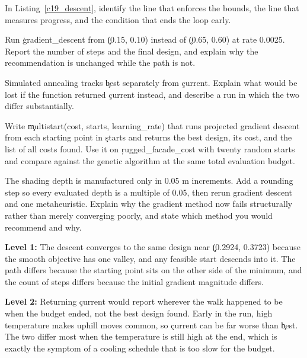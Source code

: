 

In Listing~\ref{c19_descent}, identify the line that enforces the bounds, the
line that measures progress, and the condition that ends the loop early.


Run \c{gradient_descent} from \c{(0.15, 0.10)} instead of \c{(0.65, 0.60)} at
rate 0.0025. Report the number of steps and the final design, and explain why the
recommendation is unchanged while the path is not.


Simulated annealing tracks \c{best} separately from \c{current}. Explain what
would be lost if the function returned \c{current} instead, and describe a run in
which the two differ substantially.


Write \c{multistart(cost, starts, learning_rate)} that runs projected gradient
descent from each starting point in \c{starts} and returns the best design, its
cost, and the list of all costs found. Use it on \c{rugged_facade_cost} with
twenty random starts and compare against the genetic algorithm at the same total
evaluation budget.


The shading depth is manufactured only in 0.05 m increments. Add a rounding step
so every evaluated depth is a multiple of 0.05, then rerun gradient descent and
one metaheuristic. Explain why the gradient method now fails structurally rather
than merely converging poorly, and state which method you would recommend and
why.


\textbf{Level 1:} The descent converges to the same design near
\c{(0.2924, 0.3723)} because the smooth objective has one valley, and any
feasible start descends into it. The path differs because the starting point sits
on the other side of the minimum, and the count of steps differs because the
initial gradient magnitude differs.

\textbf{Level 2:} Returning \c{current} would report wherever the walk happened
to be when the budget ended, not the best design found. Early in the run, high
temperature makes uphill moves common, so \c{current} can be far worse than
\c{best}. The two differ most when the temperature is still high at the end,
which is exactly the symptom of a cooling schedule that is too slow for the
budget.

